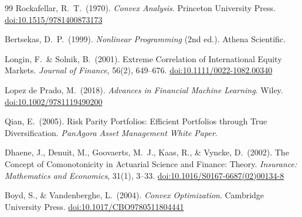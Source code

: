 \documentclass[12pt,openany]{book}
\numberwithin{equation}{chapter}
\theoremstyle{plain}
\theoremstyle{definition}
\theoremstyle{remark}
\begin{document}
\begin{thebibliography}{99}
Rockafellar, R.\ T.\ (1970).
\textit{Convex Analysis}.
Princeton University Press.
\href{https://doi.org/10.1515/9781400873173}{doi:10.1515/9781400873173}

Bertsekas, D.\ P.\ (1999).
\textit{Nonlinear Programming} (2nd ed.).
Athena Scientific.

Longin, F.\ \& Solnik, B.\ (2001).
Extreme Correlation of International Equity Markets.
\textit{Journal of Finance}, 56(2), 649--676.
\href{https://doi.org/10.1111/0022-1082.00340}{doi:10.1111/0022-1082.00340}

Lopez de Prado, M.\ (2018).
\textit{Advances in Financial Machine Learning}.
Wiley.
\href{https://doi.org/10.1002/9781119490200}{doi:10.1002/9781119490200}

Qian, E.\ (2005).
Risk Parity Portfolios: Efficient Portfolios through True Diversification.
\textit{PanAgora Asset Management White Paper}.

Dhaene, J., Denuit, M., Goovaerts, M.\ J., Kaas, R., \& Vyncke, D.\ (2002).
The Concept of Comonotonicity in Actuarial Science and Finance: Theory.
\textit{Insurance: Mathematics and Economics}, 31(1), 3--33.
\href{https://doi.org/10.1016/S0167-6687(02)00134-8}{doi:10.1016/S0167-6687(02)00134-8}

Boyd, S., \& Vandenberghe, L.\ (2004).
\textit{Convex Optimization}.
Cambridge University Press.
\href{https://doi.org/10.1017/CBO9780511804441}{doi:10.1017/CBO9780511804441}



\end{thebibliography}
\end{document}
